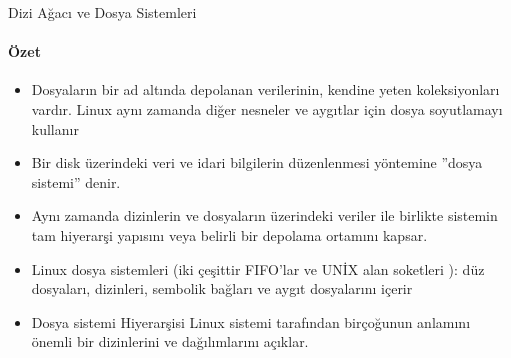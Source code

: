 \begin{section}{Dizi Ağacı ve Dosya Sistemleri}
\paragraph{Özet}{
\begin{itemize}
\item Dosyaların bir ad altında depolanan verilerinin, kendine yeten koleksiyonları vardır. Linux aynı zamanda diğer nesneler ve aygıtlar için  dosya soyutlamayı kullanır
\item Bir disk üzerindeki veri ve idari bilgilerin düzenlenmesi yöntemine ''dosya sistemi'' denir.
\item Aynı zamanda dizinlerin ve dosyaların üzerindeki veriler ile birlikte sistemin tam hiyerarşi yapısını veya belirli bir depolama ortamını kapsar.
\item Linux dosya sistemleri (iki çeşittir FIFO'lar ve UNİX alan soketleri ): düz dosyaları, dizinleri, sembolik bağları ve aygıt dosyalarını içerir
\item Dosya sistemi Hiyerarşisi Linux sistemi tarafından birçoğunun anlamını önemli bir  dizinlerini ve dağılımlarını açıklar.
\end{itemize}}

\end{section}